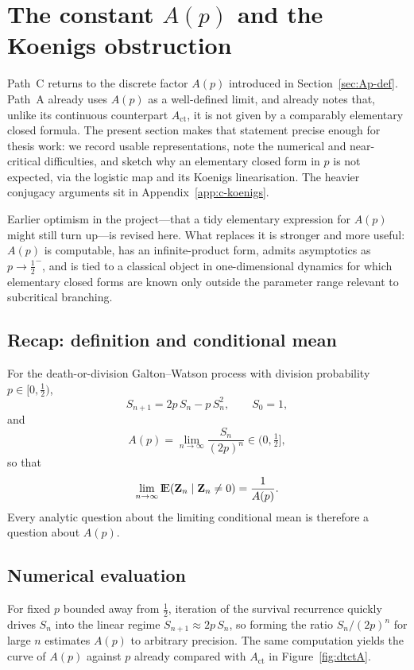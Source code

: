 \section{The constant $A(p)$ and the Koenigs obstruction}
\label{sec:ap-koenigs}

Path~C returns to the discrete factor $A(p)$ introduced in Section~\ref{sec:Ap-def}. Path~A already uses $A(p)$ as a well-defined limit, and already notes that, unlike its continuous counterpart $A_{\mathrm{ct}}$, it is not given by a comparably elementary closed formula. The present section makes that statement precise enough for thesis work: we record usable representations, note the numerical and near-critical difficulties, and sketch why an elementary closed form in $p$ is not expected, via the logistic map and its Koenigs linearisation. The heavier conjugacy arguments sit in Appendix~\ref{app:c-koenigs}.

Earlier optimism in the project---that a tidy elementary expression for $A(p)$ might still turn up---is revised here. What replaces it is stronger and more useful: $A(p)$ is computable, has an infinite-product form, admits asymptotics as $p\to\tfrac12^{-}$, and is tied to a classical object in one-dimensional dynamics for which elementary closed forms are known only outside the parameter range relevant to subcritical branching.

\subsection{Recap: definition and conditional mean}
\label{sec:ap-recap}

For the death-or-division Galton--Watson process with division probability $p\in\bigl[0,\tfrac12\bigr)$,
\[
S_{n+1} = 2p\,S_n - p\,S_n^2,
\qquad
S_0=1,
\]
and
\begin{equation}
A(p)
=
\lim_{n\to\infty}
\frac{S_n}{(2p)^n}
\in
\bigl(0,\tfrac12\bigr],
\end{equation}
so that
\[
\lim_{n\to\infty}
{\rm I}\!{\rm E}({\bf Z}_n\mid {\bf Z}_n\neq 0)
=
\frac{1}{A(p)}.
\]
Every analytic question about the limiting conditional mean is therefore a question about $A(p)$.

\subsection{Numerical evaluation}
\label{sec:ap-numeric}

For fixed $p$ bounded away from $\tfrac12$, iteration of the survival recurrence quickly drives $S_n$ into the linear regime $S_{n+1}\approx 2p\,S_n$, so forming the ratio $S_n/(2p)^n$ for large $n$ estimates $A(p)$ to arbitrary precision. The same computation yields the curve of $A(p)$ against $p$ already compared with $A_{\mathrm{ct}}$ in Figure~\ref{fig:dtctA}.

